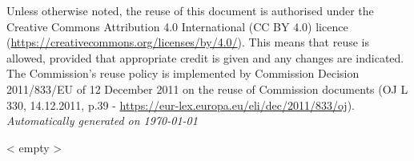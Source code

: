 \documentclass[11pt,fleqn]{book} %
\begin{document}
	\noindent Unless otherwise noted, the reuse of this document is authorised under the Creative Commons Attribution 4.0 International (CC BY 4.0) licence (\url{https://creativecommons.org/licenses/by/4.0/}). This means that reuse is allowed, provided that appropriate credit is given and any changes are indicated.
	The Commission's reuse policy is implemented by Commission Decision 2011/833/EU of 12 December 2011 on the reuse of Commission documents (OJ L 330, 14.12.2011, p.39 - \url{https://eur-lex.europa.eu/eli/dec/2011/833/oj}).\\ %


    \noindent \textit{Automatically generated on \today}\\ %



%
    \usechapterimagefalse
    \pagestyle{empty} %

    \tableofcontents %

    \cleardoublepage %

    \pagestyle{fancy} %



        < empty >


    \cleardoublepage %
    \setlength{\columnsep}{0.75cm} %
    \printindex %

\end{document}

